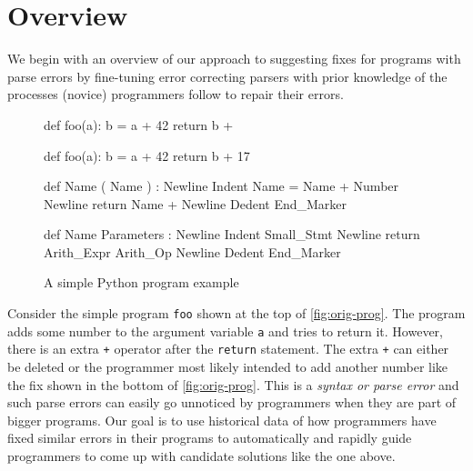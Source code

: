 \section{Overview}
\label{sec:overview}

We begin with an overview of our approach to suggesting fixes for programs with
parse errors by fine-tuning error correcting parsers with prior knowledge of the
processes (novice) programmers follow to repair their errors.

\begin{figure}[h]
\centering
\begin{minipage}[c]{0.38\linewidth}
\begin{ecode}
def foo(a):
  b = a + 42
  return b +
\end{ecode}

\begin{ecode}
def foo(a):
  b = a + 42
  return b + 17
\end{ecode}
\label{fig:orig-prog}
\end{minipage}%
\hspace{0.02\linewidth}%
\begin{minipage}[c]{0.58\linewidth}
\begin{ecode}
def Name ( Name ) : Newline
Indent Name = Name + Number Newline
return Name + Newline
Dedent End_Marker
\end{ecode}

\begin{ecode}
def Name Parameters : Newline
Indent Small_Stmt Newline
return Arith_Expr Arith_Op Newline
Dedent End_Marker
\end{ecode}
\label{fig:abstract-prog}
\end{minipage}
\caption{A simple Python program example}
\end{figure}


 Consider the simple program \texttt{foo} shown at the top
of \autoref{fig:orig-prog}. The program adds some number to the argument
variable \texttt{a} and tries to return it. However, there is an extra
\texttt{+} operator after the \texttt{return} statement. The extra \texttt{+}
can either be deleted or the programmer most likely intended to add another
number like the fix shown in the bottom of \autoref{fig:orig-prog}. This is a
\emph{syntax or parse error} and such parse errors can easily go unnoticed
\citep{Denny_2012, Ahadi_2018, VanDerSpek_2005} by programmers when they are
part of bigger programs.
%
Our goal is to use historical data of how programmers have fixed similar errors
in their programs to automatically and rapidly guide programmers to come up with
candidate solutions like the one above.


